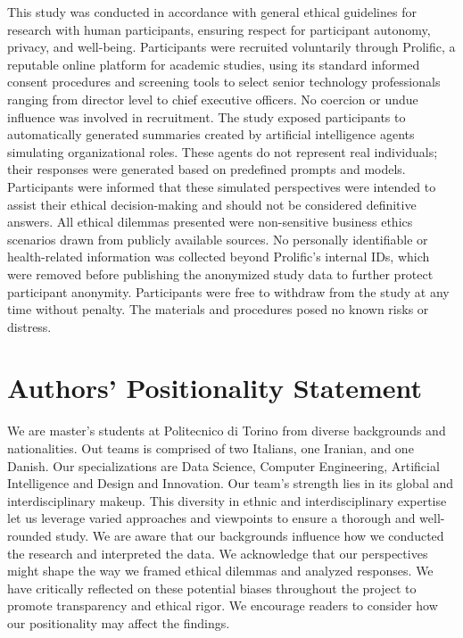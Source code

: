 \documentclass[sigconf, authorversion, nonacm, screen]{acmart}
\begin{document}
This study was conducted in accordance with general ethical guidelines for research with human participants, ensuring respect for participant autonomy, privacy, and well-being.
Participants were recruited voluntarily through Prolific, a reputable online platform for academic studies, using its standard informed consent procedures and screening tools to select senior technology professionals ranging from director level to chief executive officers. No coercion or undue influence was involved in recruitment.
The study exposed participants to automatically generated summaries created by artificial intelligence agents simulating organizational roles. These agents do not represent real individuals; their responses were generated based on predefined prompts and models. Participants were informed that these simulated perspectives were intended to assist their ethical decision-making and should not be considered definitive answers.
All ethical dilemmas presented were non-sensitive business ethics scenarios drawn from publicly available sources. 
No personally identifiable or health-related information was collected beyond Prolific’s internal IDs, which were removed before publishing the anonymized study data to further protect participant anonymity.
Participants were free to withdraw from the study at any time without penalty. The materials and procedures posed no known risks or distress.

\section{Authors' Positionality Statement}

We are master’s students at Politecnico di Torino from diverse backgrounds and nationalities.
Out teams is comprised of two Italians, one Iranian, and one Danish. 
Our specializations are Data Science, Computer Engineering, Artificial Intelligence and Design and Innovation.
Our team’s strength lies in its global and interdisciplinary makeup. This diversity in ethnic and interdisciplinary expertise let us leverage varied approaches and viewpoints to ensure a thorough and well-rounded study. 
We are aware that our backgrounds influence how we conducted the research and interpreted the data. 
We acknowledge that our perspectives might shape the way we framed ethical dilemmas and analyzed responses.
We have critically reflected on these potential biases throughout the project to promote transparency and ethical rigor. 
We encourage readers to consider how our positionality may affect the findings.
\end{document}
